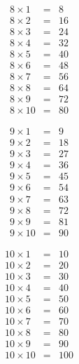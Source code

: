 \begin{footnotesize}
\begin{multicols}{5}
\begin{eqnarray*}
8 \times 1 &=& 8\\
8 \times 2 &=& 16\\
8 \times 3 &=& 24\\
8 \times 4 &=& 32\\
8 \times 5 &=& 40\\
8 \times 6 &=& 48\\
8 \times 7 &=& 56\\
8 \times 8 &=& 64\\
8 \times 9 &=& 72\\
8 \times 10 &=& 80
\end{eqnarray*}

\begin{eqnarray*}
9 \times 1 &=& 9\\
9 \times 2 &=& 18\\
9 \times 3 &=& 27\\
9 \times 4 &=& 36\\
9 \times 5 &=& 45\\
9 \times 6 &=& 54\\
9 \times 7 &=& 63\\
9 \times 8 &=& 72\\
9 \times 9 &=& 81\\
9 \times 10 &=& 90
\end{eqnarray*}

\begin{eqnarray*}
10 \times 1 &=& 10 \\
10 \times 2 &=& 20 \\
10 \times 3 &=& 30 \\
10 \times 4 &=& 40 \\
10 \times 5 &=& 50 \\
10 \times 6 &=& 60 \\
10 \times 7 &=& 70 \\
10 \times 8 &=& 80 \\
10 \times 9 &=& 90 \\
10 \times 10 &=& 100
\end{eqnarray*}
\end{multicols}
\end{footnotesize}